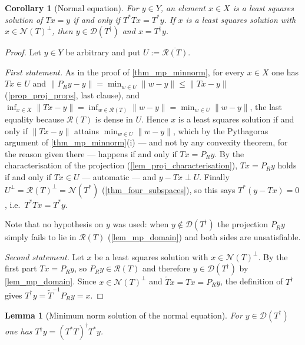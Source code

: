 \documentclass[a4paper]{report}
\theoremstyle{plain}
\newtheorem{lemma}[theorem]{Lemma}
\newtheorem{corollary}[theorem]{Corollary}
\theoremstyle{definition}
\theoremstyle{remark}
\newcommand{\Ran}{\mathcal{R}}
\newcommand{\Ker}{\mathcal{N}}
\newcommand{\Dom}{\mathcal{D}}
\newcommand{\dg}{^{\dagger}}
\begin{document}
\begin{corollary}[Normal equation]
  \label{cor_normal_equation}
  For $y \in Y$, an element $x \in X$ is a least squares solution of $Tx = y$ if and only
  if $T^{*}Tx = T^{*}y$.  If $x$ is a least squares solution with $x \in \Ker(T)^{\perp}$,
  then $y \in \Dom(T\dg)$ and $x = T\dg y$.
\end{corollary}

\begin{proof}
  Let $y \in Y$ be arbitrary and put $U := \overline{\Ran(T)}$.

  \emph{First statement.}  As in the proof of \cref{thm_mp_minnorm}, for every $x \in X$
  one has $Tx \in U$ and
  $\|P_Ry - y\| = \min_{w \in U}\|w - y\| \le \|Tx - y\|$ (\cref{prop_proj_props}, last
  clause), and
  $\inf_{x \in X}\|Tx - y\| = \inf_{w \in \Ran(T)}\|w - y\| = \min_{w \in U}\|w - y\|$,
  the last equality because $\Ran(T)$ is dense in $U$.  Hence $x$ is a least squares
  solution if and only if $\|Tx - y\|$ attains $\min_{w \in U}\|w-y\|$, which by the
  Pythagoras argument of \cref{thm_mp_minnorm}(i) --- and not by any convexity theorem,
  for the reason given there --- happens if and only if $Tx = P_Ry$.  By the
  characterisation of the projection (\cref{lem_proj_characterisation}), $Tx = P_Ry$ holds if
  and only if $Tx \in U$ --- automatic --- and $y - Tx \perp U$.  Finally
  $U^{\perp} = \Ran(T)^{\perp} = \Ker(T^{*})$ (\cref{thm_four_subspaces}), so this says
  $T^{*}(y - Tx) = 0$, i.e.\ $T^{*}Tx = T^{*}y$.

  Note that no hypothesis on $y$ was used: when $y \notin \Dom(T\dg)$ the projection $P_Ry$
  simply fails to lie in $\Ran(T)$ (\cref{lem_mp_domain}) and both sides are unsatisfiable.

  \emph{Second statement.}  Let $x$ be a least squares solution with
  $x \in \Ker(T)^{\perp}$.  By the first part $Tx = P_Ry$, so $P_Ry \in \Ran(T)$ and
  therefore $y \in \Dom(T\dg)$ by \cref{lem_mp_domain}.  Since $x \in \Ker(T)^{\perp}$ and
  $\tilde{T}x = Tx = P_Ry$, the definition of $T\dg$ gives
  $T\dg y = \tilde{T}^{-1}P_Ry = x$.
\end{proof}


\begin{lemma}[Minimum norm solution of the normal equation]
  \label{lem_normal_mp}
  For $y \in \Dom(T\dg)$ one has $T\dg y = (T^{*}T)\dg T^{*} y$.
\end{lemma}
\end{document}
